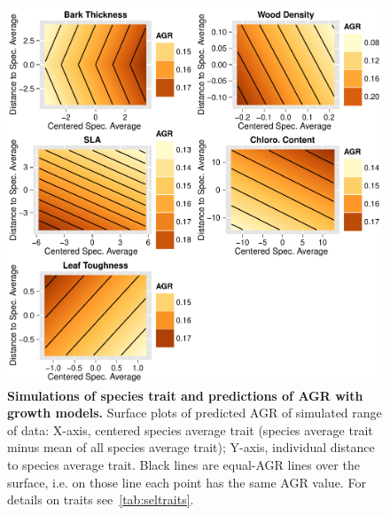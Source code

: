 \begin{figure}[!tb]
	\centering
	\includegraphics{figures/Sel_Traits_Simul_Pred_AGR_2015-05-22.pdf}
	\caption{\textbf{Simulations of species trait and predictions of AGR with growth models.} Surface plots of predicted AGR of simulated range of data: X-axis, centered species average trait (species average trait minus mean of all species average trait); Y-axis, individual distance to species average trait. Black lines are equal-AGR lines over the surface, i.e. on those line each point has the same AGR value. For details on traits see~\autoref{tab:seltraits}.}
	\label{fig:simul}
\end{figure}